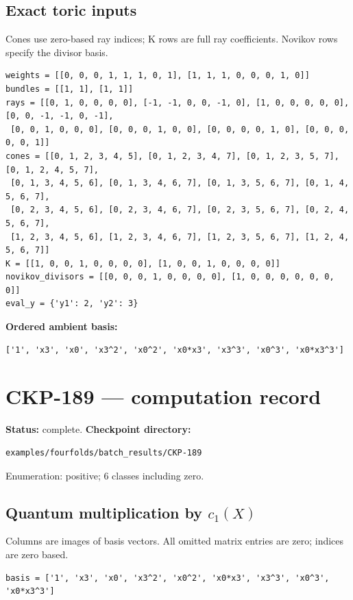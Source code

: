 \documentclass[10pt,a4paper]{article}
\begin{document}
\subsection*{Exact toric inputs}
Cones use zero-based ray indices; K rows are full ray coefficients. Novikov rows specify the divisor basis.

\begin{lstlisting}
weights = [[0, 0, 0, 1, 1, 1, 0, 1], [1, 1, 1, 0, 0, 0, 1, 0]]
bundles = [[1, 1], [1, 1]]
rays = [[0, 1, 0, 0, 0, 0], [-1, -1, 0, 0, -1, 0], [1, 0, 0, 0, 0, 0], [0, 0, -1, -1, 0, -1],
 [0, 0, 1, 0, 0, 0], [0, 0, 0, 1, 0, 0], [0, 0, 0, 0, 1, 0], [0, 0, 0, 0, 0, 1]]
cones = [[0, 1, 2, 3, 4, 5], [0, 1, 2, 3, 4, 7], [0, 1, 2, 3, 5, 7], [0, 1, 2, 4, 5, 7],
 [0, 1, 3, 4, 5, 6], [0, 1, 3, 4, 6, 7], [0, 1, 3, 5, 6, 7], [0, 1, 4, 5, 6, 7],
 [0, 2, 3, 4, 5, 6], [0, 2, 3, 4, 6, 7], [0, 2, 3, 5, 6, 7], [0, 2, 4, 5, 6, 7],
 [1, 2, 3, 4, 5, 6], [1, 2, 3, 4, 6, 7], [1, 2, 3, 5, 6, 7], [1, 2, 4, 5, 6, 7]]
K = [[1, 0, 0, 1, 0, 0, 0, 0], [1, 0, 0, 1, 0, 0, 0, 0]]
novikov_divisors = [[0, 0, 0, 1, 0, 0, 0, 0], [1, 0, 0, 0, 0, 0, 0, 0]]
eval_y = {'y1': 2, 'y2': 3}
\end{lstlisting}

\textbf{Ordered ambient basis:}
\begin{lstlisting}
['1', 'x3', 'x0', 'x3^2', 'x0^2', 'x0*x3', 'x3^3', 'x0^3', 'x0*x3^3']
\end{lstlisting}

\clearpage\section*{CKP-189 --- computation record}
\textbf{Status:} complete.
\textbf{Checkpoint directory:}
\begin{lstlisting}
examples/fourfolds/batch_results/CKP-189
\end{lstlisting}

Enumeration: positive; 6 classes including zero.
\subsection*{Quantum multiplication by $c_1(X)$}
Columns are images of basis vectors. All omitted matrix entries are zero; indices are zero based.

\begin{lstlisting}
basis = ['1', 'x3', 'x0', 'x3^2', 'x0^2', 'x0*x3', 'x3^3', 'x0^3', 'x0*x3^3']
\end{lstlisting}
\end{document}
